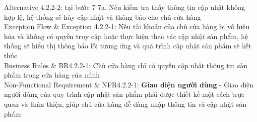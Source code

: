 \begin{usecase_table}
                    Alternative 4.2.2-2: tại bước 7\newline
                    7a. Nếu kiểm tra thấy thông tin cập nhật không hợp lệ, hệ thống sẽ hủy cập nhật và thông báo cho chủ cửa hàng\\
                    \hline
                    Exception Flow & Exception 4.2.2-1: Nếu tài khoản của chủ cửa hàng bị vô hiệu hóa và không có quyền truy cập hoặc thực hiện thao tác cập nhật sản phẩm, hệ thống sẽ hiển thị thông báo lỗi tương ứng và quá trình cập nhật sản phẩm sẽ kết thúc\\
                    \hline
                    Business Rules	& BR4.2.2-1: Chủ cửa hàng chỉ có quyền cập nhật thông tin sản phẩm trong cửa hàng của mình \\
                    \hline
                    Non-Functional Requirement & NFR4.2.2-1: \textbf{Giao diện người dùng} - Giao diện người dùng của quy trình cập nhật sản phẩm phải được thiết kế một cách trực quan và thân thiện, giúp chủ cửa hàng dễ dàng nhập thông tin và cập nhật sản phẩm
                    \\
                    \hline
                \end{usecase_table}
